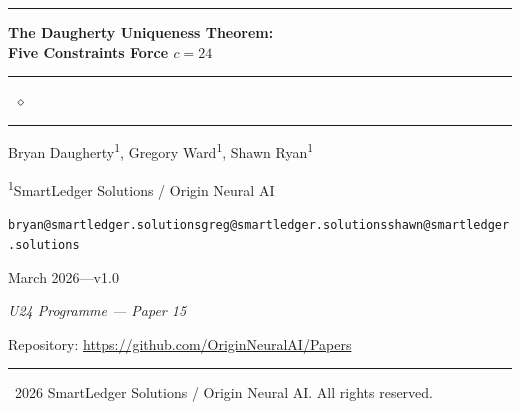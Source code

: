 \documentclass[12pt,a4paper]{article}
\theoremstyle{definition}
\theoremstyle{remark}
\begin{document}

\begin{center}

{\color{u24gold}\rule{\textwidth}{0.5pt}}
\vspace{0.8em}

{\LARGE\bfseries\color{u24navy}
The Daugherty Uniqueness Theorem:\\[4pt]
Five Constraints Force $c = 24$}

\vspace{0.8em}
{\color{u24gold}\rule{0.4\textwidth}{0.5pt}~$\diamond$~\rule{0.4\textwidth}{0.5pt}}
\vspace{0.8em}

{\large Bryan Daugherty\textsuperscript{1},\quad
Gregory Ward\textsuperscript{1},\quad
Shawn Ryan\textsuperscript{1}}

\vspace{0.4em}

{\normalsize\textsuperscript{1}SmartLedger Solutions / Origin Neural AI}

\vspace{0.4em}

{\small\texttt{bryan@smartledger.solutions}\quad\texttt{greg@smartledger.solutions}\quad\texttt{shawn@smartledger.solutions}}

\vspace{0.6em}

{\normalsize March 2026\quad---\quad v1.0}

\vspace{0.4em}

\textit{U24 Programme --- Paper 15}

\vspace{0.4em}

{\small\textcolor{u24navy}{Repository:} \url{https://github.com/OriginNeuralAI/Papers}}

\vspace{0.6em}
{\color{u24gold}\rule{\textwidth}{0.5pt}}

\end{center}

\vspace{0.5em}

{\small\textcopyright~2026 SmartLedger Solutions / Origin Neural AI. All rights reserved.}

\vspace{1em}
\end{document}
